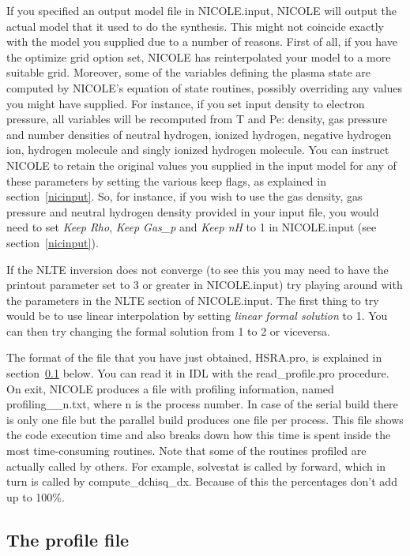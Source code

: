 If you specified an output model file in NICOLE.input, NICOLE will
output the actual model that it used to do the synthesis. This might
not coincide exactly with the model you supplied due to a number of
reasons. First of all, if you have the optimize grid option set,
NICOLE has reinterpolated your model to a more suitable
grid. Moreover, some of the variables defining the plasma state are
computed by NICOLE's equation of state routines, possibly overriding any values
you might have supplied. For instance, if you set input density to
electron pressure, all variables will be recomputed from T and Pe:
density, gas pressure and number densities of neutral hydrogen,
ionized hydrogen, negative hydrogen ion, hydrogen molecule and singly
ionized hydrogen molecule. You can instruct NICOLE to retain the
original values you supplied in the input model for any of these
parameters by setting the various keep flags, as explained in
section~\ref{nicinput}. So, for instance, if you wish to use the gas
density, gas pressure and neutral hydrogen density provided in your
input file, you would need to set {\em Keep Rho}, {\em Keep Gas\_p}
and {\em Keep nH} to 1 in NICOLE.input (see section~\ref{nicinput}).

If the NLTE inversion does not converge (to see this you may need to
have the printout parameter set to 3 or greater in NICOLE.input) try
playing around with the parameters in the NLTE section of
NICOLE.input. The first thing to try would be to use linear
interpolation by setting {\em linear formal solution} to 1. You can
then try changing the formal solution from 1 to 2 or viceversa.

The format of the file that you have just obtained, HSRA.pro, is
explained in section~\ref{profilefile} below. You can read it in IDL
with the read\_profile.pro procedure. On exit, NICOLE produces a file
with profiling information, named profiling\_\_n.txt, where n is the 
process number. In case of the serial build there is only one file but
the parallel build produces one file per process. This file shows the
code execution time and also breaks down how this time is spent inside
the most time-consuming routines. Note that some of the routines
profiled are actually called by others. For example, solvestat is
called by forward, which in turn is called by
compute\_dchisq\_dx. Because of this the percentages don't add up to
100\%.

\subsection{The profile file}
\label{profilefile}

